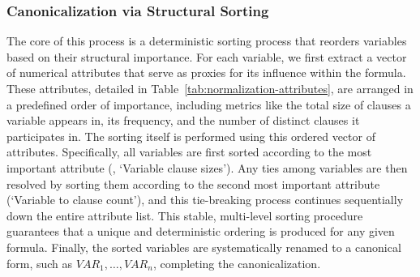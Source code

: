 \subsubsection{Canonicalization via Structural Sorting}
The core of this process is a deterministic sorting process that reorders variables based on their structural importance. For each variable, we first extract a vector of numerical attributes that serve as proxies for its influence within the formula. These attributes, detailed in Table~\ref{tab:normalization-attributes}, are arranged in a predefined order of importance, including metrics like the total size of clauses a variable appears in, its frequency, and the number of distinct clauses it participates in.
The sorting itself is performed using this ordered vector of attributes. Specifically, all variables are first sorted according to the most important attribute (\ie, `Variable clause sizes'). Any ties among variables are then resolved by sorting them according to the second most important attribute (`Variable to clause count'), and this tie-breaking process continues sequentially down the entire attribute list. This stable, multi-level sorting procedure guarantees that a unique and deterministic ordering is produced for any given formula. Finally, the sorted variables are systematically renamed to a canonical form, such as $\mathit{VAR}_1, \dots, \mathit{VAR}_n$, completing the canonicalization.

